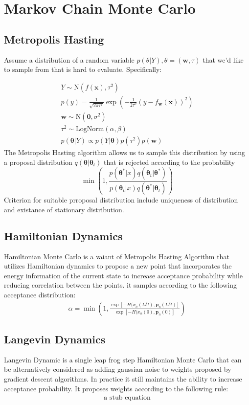 \documentclass[honours,12pt]{unswthesis}
\numberwithin{equation}{section}
\begin{document}
\section{Markov Chain Monte Carlo}
\subsection {Metropolis Hasting}
Assume a distribution of a random variable $p(\theta|Y), \theta = (\bm{w},\tau)$ that we'd like to sample from that is hard to evaluate. Specifically:

\begin{gather*} 
    Y \sim \text{N}(f(\bm{x}),\tau^2) \\
    p(y)=\frac{1}{\sqrt{2\pi\tau^2}} \exp(-\frac{1}{2\tau^2} (y-f_{\bm{w}}(\bm{x}))^2) \\ 
    \bm{w} \sim \text{N}(\mathbf{0},\sigma^2) \\ 
    \tau^2 \sim \text{LogNorm}(\alpha,\beta) \\
    p(\bm{\theta}|Y) \propto p(Y|\bm{\theta})p(\tau^2)p(\bm{w})
\end{gather*}
The Metropolis Hasting algorithm allows us to sample this distribution by using a proposal distribution $q(\bm{\theta}|\bm{\theta}_t)$ that is rejected according to the probability 
\begin{equation*}
    \min(1,\frac{p(\bm{\theta}^*|x)q(\bm{\theta}_t|\bm{\theta}^*)}{p(\bm{\theta}_t|x)q(\bm{\theta}^*|\bm{\theta}_t)})
\end{equation*}
Criterion for suitable prroposal distribution include uniqueness of distribution and existance of stationary distribution. 

\subsection{Hamiltonian Dynamics}
Hamiltonian Monte Carlo is a vaiant of Metropolis Hasting Algorithm that utilizes Hamiltonian dynamics to propose a new point that incorporates the energy information of the current state to increase acceptance probability while reducing correlation between the points.
it samples according to the following acceptance distribution:
\begin{gather*}
    \alpha = \min(1,\frac{\exp[-H(x_n (L\delta t),\mathbf{p}_n(L\delta t) ]} {\exp[-H(x_n (0),\mathbf{p}_n(0) ]} )
\end{gather*} 

\subsection{Langevin Dynamics}
Langevin Dynamic is a single leap frog step Hamiltonian Monte Carlo that can be alternatively considered as adding gaussian noise to weights proposed by gradient descent algorithms. In practice it still maintains the ability to increase acceptance probability. It proposes weights according to the following rule: 
\begin{gather*}
    \text{a stub equation}
\end{gather*}
\end{document}
